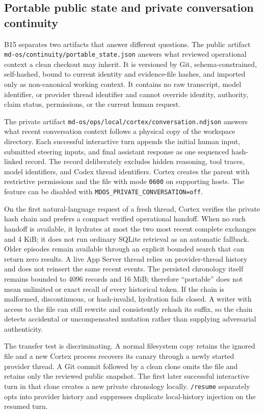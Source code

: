 \documentclass[10pt,twocolumn]{article}
\theoremstyle{definition}
\theoremstyle{plain}
\theoremstyle{remark}
\newcommand{\file}[1]{\nolinkurl{#1}}
\begin{document}
\subsection{Portable public state and private conversation continuity}
\label{sec:portable-continuity}

B15 separates two artifacts that answer different questions.  The public artifact \file{md-os/continuity/portable\_state.json} answers what reviewed operational context a clean checkout may inherit.  It is versioned by Git, schema-constrained, self-hashed, bound to current identity and evidence-file hashes, and imported only as non-canonical working context.  It contains no raw transcript, model identifier, or provider thread identifier and cannot override identity, authority, claim status, permissions, or the current human request.

The private artifact \file{md-os/ops/local/cortex/conversation.ndjson} answers what recent conversation context follows a physical copy of the workspace directory.  Each successful interactive turn appends the initial human input, submitted steering inputs, and final assistant response as one sequenced hash-linked record.  The record deliberately excludes hidden reasoning, tool traces, model identifiers, and Codex thread identifiers.  Cortex creates the parent with restrictive permissions and the file with mode \file{0600} on supporting hosts.  The feature can be disabled with \file{MDOS\_PRIVATE\_CONVERSATION=off}.

On the first natural-language request of a fresh thread, Cortex verifies the private hash chain and prefers a compact verified operational handoff.  When no such handoff is available, it hydrates at most the two most recent complete exchanges and 4 KiB; it does not run ordinary SQLite retrieval as an automatic fallback.  Older episodes remain available through an explicit bounded search that can return zero results.  A live App Server thread relies on provider-thread history and does not reinsert the same recent events.  The persisted chronology itself remains bounded to 4096 records and 16 MiB; therefore ``portable'' does not mean unlimited or exact recall of every historical token.  If the chain is malformed, discontinuous, or hash-invalid, hydration fails closed.  A writer with access to the file can still rewrite and consistently rehash its suffix, so the chain detects accidental or uncompensated mutation rather than supplying adversarial authenticity.

The transfer test is discriminating.  A normal filesystem copy retains the ignored file and a new Cortex process recovers its canary through a newly started provider thread.  A Git commit followed by a clean clone omits the file and retains only the reviewed public snapshot.  The first later successful interactive turn in that clone creates a new private chronology locally.  \file{/resume} separately opts into provider history and suppresses duplicate local-history injection on the resumed turn.
\end{document}
